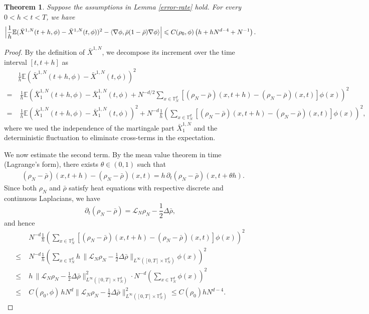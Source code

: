 \documentclass[UTF-8,reqno]{amsart}
\numberwithin{equation}{section}
\newtheorem{theorem}{Theorem}[section]
\def\leq{\leqslant}
\def\leq{\leqslant}
\begin{document}
\begin{theorem}
	Suppose the assumptions in Lemma \ref{error-rate} hold. For every $0 < h < t < T$, we have
	\begin{align}
	\Big|\frac{1}{h}\mathbb{E}(\bar{X}^{1,N}(t+h,\phi)-\bar{X}^{1,N}(t,\phi))^2 - \langle \nabla\phi, \bar{\rho}(1-\bar{\rho}) \nabla\phi \rangle \Big|\leq  C(\rho_0,\phi)\left(h + hN^{d-4}+N^{-1}\right). \notag
	\end{align}
\end{theorem}

\begin{proof}
By the definition of $\bar{X}^{1,N}$, we decompose its increment over the time interval $[t, t+h]$ as
\begin{align*}
	&\frac{1}{h} \mathbb{E}(\bar{X}^{1,N}(t+h,\phi) - \bar{X}^{1,N}(t,\phi))^2 \\
	=&\; \frac{1}{h} \mathbb{E} \left( \bar{X}^{1,N}_1(t+h,\phi) - \bar{X}^{1,N}_1(t,\phi) + N^{-d/2} \sum_{x \in \mathbb{T}^d_N} \left[ (\rho_N - \bar{\rho})(x,t+h) - (\rho_N - \bar{\rho})(x,t) \right] \phi(x) \right)^2 \\
	=&\; \frac{1}{h} \mathbb{E}\left( \bar{X}^{1,N}_1(t+h,\phi) - \bar{X}^{1,N}_1(t,\phi) \right)^2 + N^{-d} \frac{1}{h} \left( \sum_{x \in \mathbb{T}^d_N} \left[ (\rho_N - \bar{\rho})(x,t+h) - (\rho_N - \bar{\rho})(x,t) \right] \phi(x) \right)^2,
\end{align*}
where we used the independence of the martingale part $\bar{X}^{1,N}_1$ and the deterministic fluctuation to eliminate cross-terms in the expectation.

We now estimate the second term. By the mean value theorem in time (Lagrange's form), there exists $\theta \in (0,1)$ such that
\begin{align*}
	&(\rho_N - \bar{\rho})(x,t+h) - (\rho_N - \bar{\rho})(x,t) = h\,\partial_t(\rho_N - \bar{\rho})(x,t + \theta h).
\end{align*}
Since both $\rho_N$ and $\bar{\rho}$ satisfy heat equations with respective discrete and continuous Laplacians, we have
$$
\partial_t (\rho_N - \bar{\rho}) = \mathcal{L}_N \rho_N - \frac{1}{2}\Delta \bar{\rho},
$$
and hence
\begin{align*}
	&N^{-d} \frac{1}{h} \left( \sum_{x \in \mathbb{T}^d_N} \left[ (\rho_N - \bar{\rho})(x,t+h) - (\rho_N - \bar{\rho})(x,t) \right] \phi(x) \right)^2 \\
	\leq\;& N^{-d} \frac{1}{h} \left( \sum_{x \in \mathbb{T}^d_N} h\,\|\mathcal{L}_N \rho_N - \frac{1}{2}\Delta \bar{\rho}\|_{L^\infty([0,T] \times \mathbb{T}^d_N)} \phi(x) \right)^2 \\
	\leq\;& h\, \|\mathcal{L}_N \rho_N - \frac{1}{2}\Delta \bar{\rho} \|^2_{L^\infty([0,T] \times \mathbb{T}^d_N)} \cdot N^{-d} \left( \sum_{x \in \mathbb{T}^d_N} \phi(x) \right)^2 \\
	\leq\;& C(\rho_0,\phi)\, h N^d \|\mathcal{L}_N \rho_N -\frac{1}{2}\Delta \bar{\rho} \|^2_{L^\infty([0,T] \times \mathbb{T}^d_N)} \leq C(\rho_0)hN^{d-4}.
\end{align*}


\end{proof}
\end{document}
